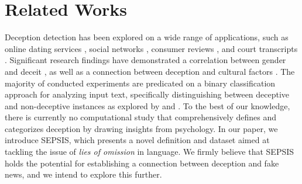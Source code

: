 \section{Related Works}
\vspace{-1mm}

Deception detection has been explored on a wide range of applications, such as online dating services \cite{toma2010reading} \cite{guadagno2012dating}, social networks \cite{ho2013guess}, consumer reviews \cite{li2014towards} \cite{ott2011finding}, and court transcripts \cite{fornaciari2013automatic} \cite{perez2015deception}. Significant research findings have demonstrated a correlation between gender and deceit \cite{perez2015experiments}, as well as a connection between deception and cultural factors \cite{perez2014cross}. The majority of conducted experiments are predicated on a binary classification approach for analyzing input text, specifically distinguishing between deceptive and non-deceptive instances as explored by \cite{mbaziira2016text} and \cite{mihalcea2009lie}. To the best of our knowledge, there is currently no computational study that comprehensively defines and categorizes deception by drawing insights from psychology. In our paper, we introduce SEPSIS, which presents a novel definition and dataset aimed at tackling the issue of \emph{lies of omission} in language. We firmly believe that SEPSIS holds the potential for establishing a connection between deception and fake news, and we intend to explore this further.




